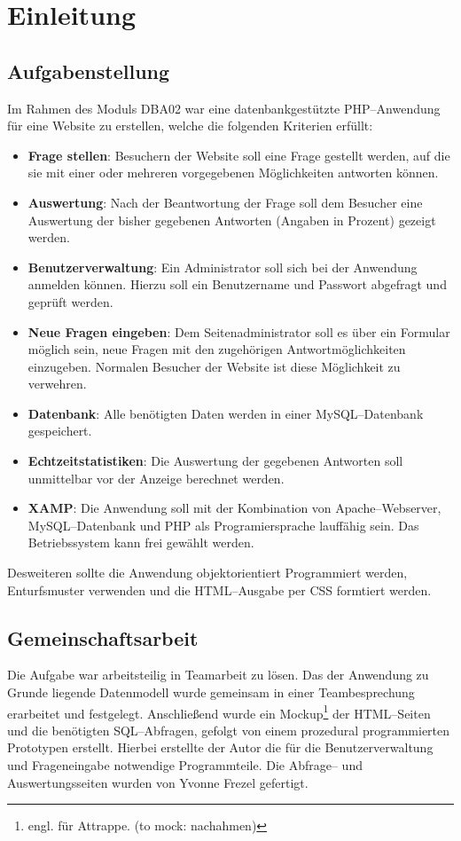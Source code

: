 \section{Einleitung}
\subsection{Aufgabenstellung}

Im Rahmen des Moduls DBA02 war eine datenbankgestützte PHP--Anwendung für eine Website zu erstellen, welche die folgenden Kriterien erfüllt:

\begin{itemize}
\item \textbf{Frage stellen}: Besuchern der Website soll eine Frage gestellt werden, auf die sie mit einer oder mehreren vorgegebenen Möglichkeiten antworten können.
\item \textbf{Auswertung}: Nach der Beantwortung der Frage soll dem Besucher eine Auswertung der bisher gegebenen Antworten (Angaben in Prozent) gezeigt werden.
\item \textbf{Benutzerverwaltung}: Ein Administrator soll sich bei der Anwendung anmelden können. Hierzu soll ein Benutzername und Passwort abgefragt und geprüft werden.
\item \textbf{Neue Fragen eingeben}: Dem Seitenadministrator soll es über ein Formular möglich sein, neue Fragen mit den zugehörigen Antwortmöglichkeiten einzugeben. Normalen Besucher der Website ist diese Möglichkeit zu verwehren.  
\item \textbf{Datenbank}: Alle benötigten Daten werden in einer MySQL--Datenbank gespeichert.
\item \textbf{Echtzeitstatistiken}: Die Auswertung der gegebenen Antworten soll unmittelbar vor der Anzeige berechnet werden.
\item \textbf{XAMP}: Die Anwendung soll mit der Kombination von Apache--Webserver, MySQL--Datenbank und PHP als Programiersprache lauffähig sein. Das Betriebssystem kann frei gewählt werden. 
\end{itemize}

Desweiteren sollte die Anwendung objektorientiert Programmiert werden, Enturfsmuster verwenden und die HTML--Ausgabe per CSS formtiert werden.

\subsection{Gemeinschaftsarbeit}

Die Aufgabe war arbeitsteilig in Teamarbeit zu lösen. Das der Anwendung zu Grunde liegende Datenmodell wurde gemeinsam in einer Teambesprechung erarbeitet und festgelegt. Anschließend wurde ein Mockup\footnote{engl. für Attrappe. (to mock: nachahmen)} der HTML--Seiten und die benötigten SQL--Abfragen, gefolgt von einem prozedural programmierten Prototypen erstellt. Hierbei erstellte der Autor die für die Benutzerverwaltung und Frageneingabe notwendige Programmteile. Die Abfrage-- und Auswertungsseiten wurden von Yvonne Frezel gefertigt.


